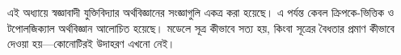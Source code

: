 \documentclass[../../../include/open-logic-chapter]{subfiles}
\begin{document}

\begin{editorial}
  এই অধ্যায়ে স্বজ্ঞাবাদী যুক্তিবিদ্যার অর্থবিজ্ঞানের সংজ্ঞাগুলি একত্র
  করা হয়েছে। এ পর্যন্ত কেবল ক্রিপকে-ভিত্তিক ও টপোলজিক্যাল
  অর্থবিজ্ঞান আলোচিত হয়েছে। মডেলে সূত্র কীভাবে সত্য হয়, কিংবা
  সূত্রের বৈধতার প্রমাণ কীভাবে দেওয়া হয়---কোনোটিরই উদাহরণ এখনো নেই।
\end{editorial}


\OLEndChapterHook
\end{document}
